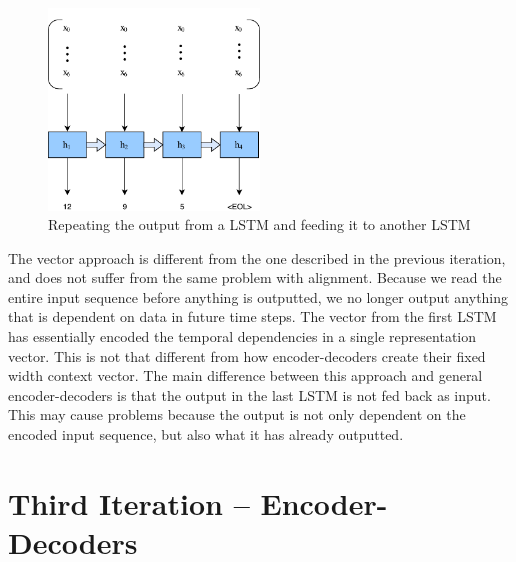 \begin{figure}[ht]
    \centering
    \includegraphics[width=0.5\textwidth]{fig/development_process/lstm-vector-projection-decoder.pdf}
    \caption{Repeating the output from a LSTM and feeding it to another LSTM}
    \label{fig:lstm-vector-projection-decoder}
\end{figure}

The vector approach is different from the one described in the previous iteration, and does not suffer from the same problem with alignment. Because we read the entire input sequence before anything is outputted, we no longer output anything that is dependent on data in future time steps. The vector from the first LSTM has essentially encoded the temporal dependencies in a single representation vector. This is not that different from how encoder-decoders create their fixed width context vector. The main difference between this approach and general encoder-decoders is that the output in the last LSTM is not fed back as input. This may cause problems because the output is not only dependent on the encoded input sequence, but also what it has already outputted.


\section{Third Iteration -- Encoder-Decoders}